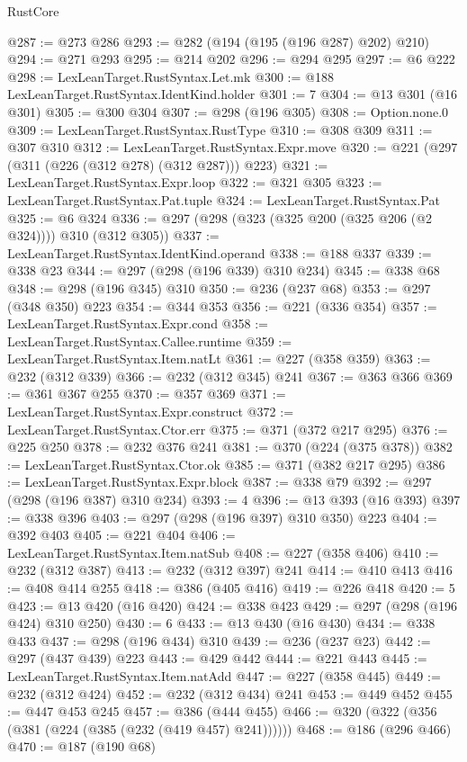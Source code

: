 \begin{lexlean}{RustCore}
\begin{coremodule}
@287 := @273 @286
@293 := @282 (@194 (@195 (@196 @287) @202) @210)
@294 := @271 @293
@295 := @214 @202
@296 := @294 @295
@297 := @6 @222
@298 := LexLeanTarget.RustSyntax.Let.mk
@300 := @188 LexLeanTarget.RustSyntax.IdentKind.holder
@301 := 7
@304 := @13 @301 (@16 @301)
@305 := @300 @304
@307 := @298 (@196 @305)
@308 := Option.none.{0}
@309 := LexLeanTarget.RustSyntax.RustType
@310 := @308 @309
@311 := @307 @310
@312 := LexLeanTarget.RustSyntax.Expr.move
@320 := @221 (@297 (@311 (@226 (@312 @278) (@312 @287))) @223)
@321 := LexLeanTarget.RustSyntax.Expr.loop
@322 := @321 @305
@323 := LexLeanTarget.RustSyntax.Pat.tuple
@324 := LexLeanTarget.RustSyntax.Pat
@325 := @6 @324
@336 := @297 (@298 (@323 (@325 @200 (@325 @206 (@2 @324)))) @310 (@312 @305))
@337 := LexLeanTarget.RustSyntax.IdentKind.operand
@338 := @188 @337
@339 := @338 @23
@344 := @297 (@298 (@196 @339) @310 @234)
@345 := @338 @68
@348 := @298 (@196 @345) @310
@350 := @236 (@237 @68)
@353 := @297 (@348 @350) @223
@354 := @344 @353
@356 := @221 (@336 @354)
@357 := LexLeanTarget.RustSyntax.Expr.cond
@358 := LexLeanTarget.RustSyntax.Callee.runtime
@359 := LexLeanTarget.RustSyntax.Item.natLt
@361 := @227 (@358 @359)
@363 := @232 (@312 @339)
@366 := @232 (@312 @345) @241
@367 := @363 @366
@369 := @361 @367 @255
@370 := @357 @369
@371 := LexLeanTarget.RustSyntax.Expr.construct
@372 := LexLeanTarget.RustSyntax.Ctor.err
@375 := @371 (@372 @217 @295)
@376 := @225 @250
@378 := @232 @376 @241
@381 := @370 (@224 (@375 @378))
@382 := LexLeanTarget.RustSyntax.Ctor.ok
@385 := @371 (@382 @217 @295)
@386 := LexLeanTarget.RustSyntax.Expr.block
@387 := @338 @79
@392 := @297 (@298 (@196 @387) @310 @234)
@393 := 4
@396 := @13 @393 (@16 @393)
@397 := @338 @396
@403 := @297 (@298 (@196 @397) @310 @350) @223
@404 := @392 @403
@405 := @221 @404
@406 := LexLeanTarget.RustSyntax.Item.natSub
@408 := @227 (@358 @406)
@410 := @232 (@312 @387)
@413 := @232 (@312 @397) @241
@414 := @410 @413
@416 := @408 @414 @255
@418 := @386 (@405 @416)
@419 := @226 @418
@420 := 5
@423 := @13 @420 (@16 @420)
@424 := @338 @423
@429 := @297 (@298 (@196 @424) @310 @250)
@430 := 6
@433 := @13 @430 (@16 @430)
@434 := @338 @433
@437 := @298 (@196 @434) @310
@439 := @236 (@237 @23)
@442 := @297 (@437 @439) @223
@443 := @429 @442
@444 := @221 @443
@445 := LexLeanTarget.RustSyntax.Item.natAdd
@447 := @227 (@358 @445)
@449 := @232 (@312 @424)
@452 := @232 (@312 @434) @241
@453 := @449 @452
@455 := @447 @453 @245
@457 := @386 (@444 @455)
@466 := @320 (@322 (@356 (@381 (@224 (@385 (@232 (@419 @457) @241))))))
@468 := @186 (@296 @466)
@470 := @187 (@190 @68)

\end{coremodule}
\end{lexlean}
